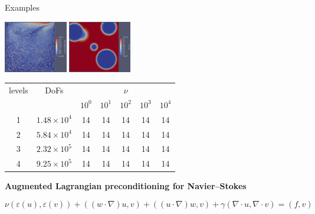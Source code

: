 \documentclass[paperwidth=60in,paperheight=36in,landscape]{baposter}
\begin{document}
\begin{poster}
\begin{posterbox}[name=examples, column=4, span=2, height=0.85]{Examples}
    \vspace{0.5\baselineskip}
    \begin{minipage}[c]{0.4\textwidth}
      \strut\vspace*{-\baselineskip}\newline
      {\centering \includegraphics[height=2.25cm]{stokes-velocity}
        \includegraphics[height=2.25cm]{stokes-viscosity}\par}
    \end{minipage}
    \hfill
    \hspace{0.5em}
    \begin{minipage}[c]{0.6\textwidth}
      \strut\vspace*{-\baselineskip}\newline
      \begin{tabular}{cc|ccccc}
        \toprule
        levels & DoFs & \multicolumn{5}{c}{$\nu$} \\
                  && $10^0$ & $10^1$ & $10^2$ & $10^3$ & $10^4$ \\
        \midrule
        1 & $1.48 \times 10^{4}$ & 14 & 14 & 14 & 14 & 14\\
        2 & $5.84 \times 10^{4}$ & 14 & 14 & 14 & 14 & 14\\
        3 & $2.32 \times 10^{5}$ & 14 & 14 & 14 & 14 & 14\\
        4 & $9.25 \times 10^{5}$ & 14 & 14 & 14 & 14 & 14\\
        \bottomrule
      \end{tabular}
    \end{minipage}

    \vspace{1.75\baselineskip}
    {\centering\Large\bfseries Augmented Lagrangian preconditioning for
      Navier--Stokes\strut\par}
    \vspace{-0.75\baselineskip}
    \begin{equation*}
      \nu (\varepsilon{(u)}, \varepsilon{(v)}) + ((w \cdot \nabla) u,
      v) + ((u \cdot \nabla)w, v) + \gamma(\nabla \cdot u, \nabla \cdot v) = (f, v)
    \end{equation*}


\end{posterbox}
\end{poster}
\end{document}
